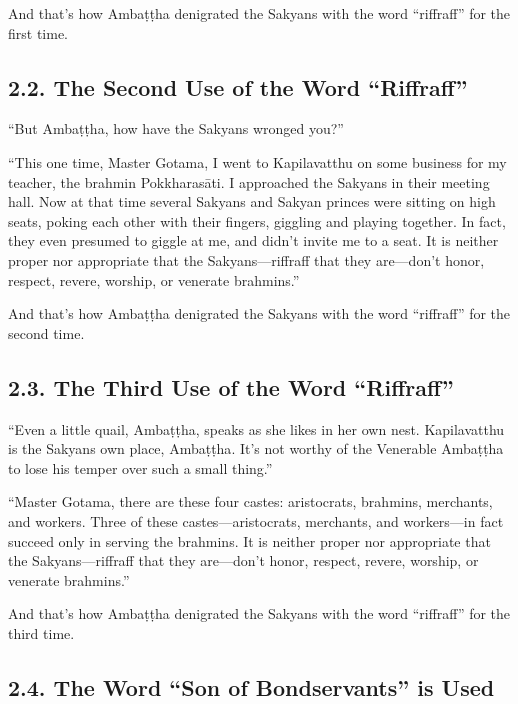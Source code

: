 \documentclass[12pt,openany]{book}%
\begin{document}
And that’s how \textsanskrit{Ambaṭṭha} denigrated the Sakyans with the word “riffraff” for the first time. 

\subsection*{2.2. The Second Use of the Word “Riffraff” }

“But \textsanskrit{Ambaṭṭha}, how have the Sakyans wronged you?” 

“This one time, Master Gotama, I went to Kapilavatthu on some business for my teacher, the brahmin \textsanskrit{Pokkharasāti}. I approached the Sakyans in their meeting hall. Now at that time several Sakyans and Sakyan princes were sitting on high seats, poking each other with their fingers, giggling and playing together. In fact, they even presumed to giggle at me, and didn’t invite me to a seat. It is neither proper nor appropriate that the Sakyans—riffraff that they are—don’t honor, respect, revere, worship, or venerate brahmins.” 

And that’s how \textsanskrit{Ambaṭṭha} denigrated the Sakyans with the word “riffraff” for the second time. 

\subsection*{2.3. The Third Use of the Word “Riffraff” }

“Even a little quail, \textsanskrit{Ambaṭṭha}, speaks as she likes in her own nest. Kapilavatthu is the Sakyans own place, \textsanskrit{Ambaṭṭha}. It’s not worthy of the Venerable \textsanskrit{Ambaṭṭha} to lose his temper over such a small thing.” 

“Master Gotama, there are these four castes: aristocrats, brahmins, merchants, and workers. Three of these castes—aristocrats, merchants, and workers—in fact succeed only in serving the brahmins. It is neither proper nor appropriate that the Sakyans—riffraff that they are—don’t honor, respect, revere, worship, or venerate brahmins.” 

And that’s how \textsanskrit{Ambaṭṭha} denigrated the Sakyans with the word “riffraff” for the third time. 

\subsection*{2.4. The Word “Son of Bondservants” is Used }
\end{document}
